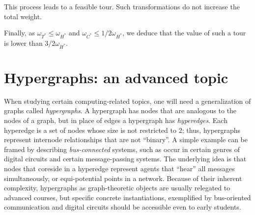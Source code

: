 This process leads to a feasible tour. 
Such transformations do not increase the total weight.

Finally, 
as $\omega_{T^*} \leq \omega_{H^*}$ and $\omega_{C^*} \leq 1/2 \omega_{H^*}$,
we deduce that the value of such a tour is lower than $3/2 \omega_{H^*}$.
 


\section{Hypergraphs: an advanced topic}

When studying certain computing-related topics, one will
need a generalization of graphs called {\em hypergraphs}.  A
hypergraph has nodes that are analogous to the nodes of a graph, but
in place of edges a hypergraph has {\em hyperedges}.  Each hyperedge
is a set of nodes whose size is not restricted to $2$; thus,
hypergraphs represent internode relationships that are not ``binary''.
A simple example can be framed by describing {\em bus-connected}
systems, such as occur in certain genres of digital circuits and
certain message-passing systems.  The underlying idea is that nodes
that coreside in a hyperedge represent agents that ``hear'' all
messages simultaneously, or equi-potential points in a network.
Because of their inherent complexity, hypergraphs as graph-theoretic
objects are usually relegated to advanced courses, but specific
concrete instantiations, exemplified by bus-oriented communication and
digital circuits should be accessible even to early students.


